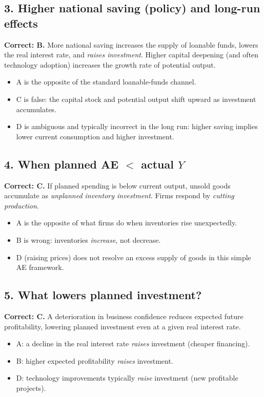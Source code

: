 \documentclass[12pt]{article}
\begin{document}
\subsection*{3. Higher national saving (policy) and long-run effects}
\textbf{Correct: B.} More national saving increases the supply of loanable funds, lowers the real interest rate, and \emph{raises investment}. Higher capital deepening (and often technology adoption) increases the growth rate of potential output.
\begin{itemize}
    \item A is the opposite of the standard loanable-funds channel.
    \item C is false: the capital stock and potential output shift upward as investment accumulates.
    \item D is ambiguous and typically incorrect in the long run: higher saving implies lower current consumption and higher investment.
\end{itemize}

\subsection*{4. When planned AE $<$ actual $Y$}
\textbf{Correct: C.} If planned spending is below current output, unsold goods accumulate as \textit{unplanned inventory investment}. Firms respond by \emph{cutting production}.
\begin{itemize}
    \item A is the opposite of what firms do when inventories rise unexpectedly.
    \item B is wrong: inventories \emph{increase}, not decrease.
    \item D (raising prices) does not resolve an excess supply of goods in this simple AE framework.
\end{itemize}

\subsection*{5. What lowers planned investment?}
\textbf{Correct: C.} A deterioration in business confidence reduces expected future profitability, lowering planned investment even at a given real interest rate.
\begin{itemize}
    \item A: a decline in the real interest rate \emph{raises} investment (cheaper financing).
    \item B: higher expected profitability \emph{raises} investment.
    \item D: technology improvements typically \emph{raise} investment (new profitable projects).
\end{itemize}
\end{document}

